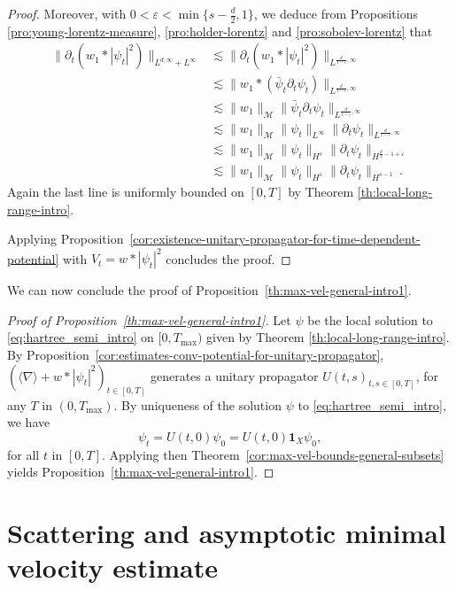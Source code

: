 \documentclass[12pt]{article}
\newcommand{\jnabla}{{\langle\nabla\rangle}}
\theoremstyle{plain}
\newcommand{\meas}{\mathcal{M}}
\begin{document}
\begin{proof}
    Moreover, with $0<\varepsilon<\min\{s-\frac{d}{2},1\}$, we deduce from Propositions \ref{pro:young-lorentz-measure}, \ref{pro:holder-lorentz} and \ref{pro:sobolev-lorentz} that
       \begin{align*}
       \|\partial_t(w_{1}*|\psi_t|^2)\|_{L^{d,\infty}+L^\infty}
       &\lesssim \|\partial_t(w_{1}*|\psi_t|^2)\|_{L^{\frac{d}{1-\varepsilon},\infty}} \\
       &\lesssim \|w_{1}*(\bar\psi_t \partial_t\psi_t)\|_{L^{\frac{d}{1-\varepsilon},\infty}} \\
       & \lesssim \|w_{1}\|_{\meas} \|\bar\psi_t \partial_t\psi_t\|_{L^{\frac{d}{1-\varepsilon},\infty}} \\
       & \lesssim \|w_{1}\|_{\meas} \|\psi_t\|_{L^{\infty}} \|\partial_t\psi_t\|_{L^{\frac{d}{1-\varepsilon},\infty}} \\
       & \lesssim \|w_{1}\|_{\meas} \|\psi_t\|_{H^{s}} \|\partial_t\psi_t\|_{H^{\frac{d}{2} -1+\varepsilon}} \\
       & \lesssim \|w_{1}\|_{\meas} \|\psi_t\|_{H^{s}} \|\partial_t\psi_t\|_{H^{s-1}}\,.
   \end{align*}
Again the last line is uniformly bounded on $[0,T]$ by Theorem \ref{th:local-long-range-intro}.

Applying Proposition~\ref{cor:existence-unitary-propagator-for-time-dependent-potential} with $V_t=w*|\psi_t|^2$ concludes the proof.
\end{proof}

We can now conclude the proof of Proposition~\ref{th:max-vel-general-intro1}.
\begin{proof}[Proof of Proposition~\ref{th:max-vel-general-intro1}]
Let $\psi$ be the local solution to \eqref{eq:hartree_semi_intro} on $[0,T_{\mathrm{max}})$ given by Theorem \ref{th:local-long-range-intro}. By Proposition~\ref{cor:estimates-conv-potential-for-unitary-propagator}, $(\jnabla + w*|\psi_t|^2)_{t\in[0,T]}$ generates a unitary propagator $U(t,s)_{t,s\in[0,T]}$, for any $T$ in $(0,T_{\max})$. By uniqueness of the solution $\psi$ to \eqref{eq:hartree_semi_intro}, we have
\begin{equation*}
    \psi_t=U(t,0)\psi_0=U(t,0)\mathbf{1}_X\psi_0,
\end{equation*}
for all $t$ in $[0,T]$. 
Applying then Theorem~\ref{cor:max-vel-bounds-general-subsets} yields Proposition~\ref{th:max-vel-general-intro1}.
\end{proof}

	
\section{Scattering and asymptotic minimal velocity estimate}\label{sec:min-vel}
		
\end{document}
